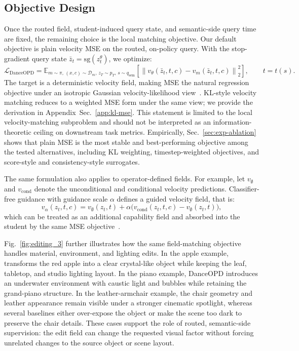 \subsection{Objective Design}
\label{sec:objective-design}

Once the routed field, student-induced query state, and semantic-side query time are fixed, the remaining choice is the local matching objective. Our default objective is plain velocity MSE on the routed, on-policy query. With the stop-gradient query state $\bar z_t=\mathrm{sg}(z_t^\theta)$, we optimize:
\begin{equation}
  \mathcal{L}_{\mathrm{DanceOPD}}
  =
  \mathbb{E}_{m\sim\pi,\,(x,c)\sim\mathcal{D}_m,\,z_T\sim p_T,\,s\sim q_{\mathrm{sem}}}
  \left[
    \left\|v_\theta(\bar z_t,t,c)-v_m(\bar z_t,t,c)\right\|_2^2
  \right], \qquad t=t(s).
  \label{eq:danceopd-mse}
\end{equation}
The target is a deterministic velocity field, making MSE the natural regression objective under an isotropic Gaussian velocity-likelihood view~\cite{lipman2022flow,ho2020denoising}. KL-style velocity matching reduces to a weighted MSE form under the same view; we provide the derivation in Appendix~Sec.~\ref{app:kl-mse}. This statement is limited to the local velocity-matching subproblem and should not be interpreted as an information-theoretic ceiling on downstream task metrics. Empirically, Sec.~\ref{sec:exp-ablation} shows that plain MSE is the most stable and best-performing objective among the tested alternatives, including KL weighting, timestep-weighted objectives, and score-style and consistency-style surrogates.

The same formulation also applies to operator-defined fields. For example, let $v_{\emptyset}$ and $v_{\mathrm{cond}}$ denote the unconditional and conditional velocity predictions. Classifier-free guidance with guidance scale $\alpha$ defines a guided velocity field, that is:
\begin{equation}
  v_{\alpha}(z_t,t,c)
  = v_{\emptyset}(z_t,t)
  + \alpha\bigl(v_{\mathrm{cond}}(z_t,t,c)-v_{\emptyset}(z_t,t)\bigr),
  \label{eq:cfg-field}
\end{equation}
which can be treated as an additional capability field and absorbed into the student by the same MSE objective~\cite{ho2022classifier}.

Fig.~\ref{fig:editing_3} further illustrates how the same field-matching objective handles material, environment, and lighting edits. In the apple example, \name{} transforms the red apple into a clear crystal-like object while keeping the leaf, tabletop, and studio lighting layout. In the piano example, DanceOPD introduces an underwater environment with caustic light and bubbles while retaining the grand-piano structure. In the leather-armchair example, the chair geometry and leather appearance remain visible under a stronger cinematic spotlight, whereas several baselines either over-expose the object or make the scene too dark to preserve the chair details. These cases support the role of routed, semantic-side supervision: the edit field can change the requested visual factor without forcing unrelated changes to the source object or scene layout.


